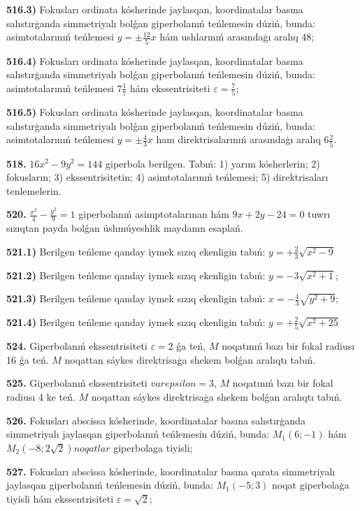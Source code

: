 \textbf{516.3)} Fokusları ordinata kósherinde jaylasqan, koordinatalar basına salıstırģanda simmetriyalı bolǵan giperbolanıń teńlemesin dúziń, bunda: asimtotalarınıń teńlemesi $y= \pm \frac{12}{5} x$ hám ushlarınıń arasındaģı aralıq 48;

\textbf{516.4)} Fokusları ordinata kósherinde jaylasqan, koordinatalar basına salıstırģanda simmetriyalı bolǵan giperbolanıń teńlemesin dúziń, bunda: asimtotalarınıń teńlemesi $7 \frac{1}{7}$ hám ekssentrisiteti $\varepsilon=\frac{7}{5}$;

\textbf{516.5)} Fokusları ordinata kósherinde jaylasqan, koordinatalar basına salıstırģanda simmetriyalı bolǵan giperbolanıń teńlemesin dúziń, bunda: asimtotalarınıń teńlemesi $y= \pm \frac{4}{3} x$ ham direktrisalarınıń arasındaģı aralıq $6 \frac{2}{5}$.

\textbf{518.} $16 x^2-9 y^2=144$ giperbola berilgen. Tabıń: 1) yarım kósherlerin; 2) fokusların; 3) ekssentrisitetin; 4) asimtotalarınıń teńlemesi; 5) direktrisaları tenlemelerin.

\textbf {520.} $\frac{x^2}{4}-\frac{y^2}{9}=1$ giperbolanıń asimptotalarınan hám $9 x+2 y-24=0$ tuwrı sızıqtan payda bolǵan úshmúyeshlik maydanın esaplań.

\textbf{521.1) } Berilgen teńleme qanday iymek sızıq ekenligin tabıń: $y=+\frac{2}{3} \sqrt{x^2-9}$

\textbf{521.2)} Berilgen teńleme qanday iymek sızıq ekenligin tabıń: $y=-3 \sqrt{x^2+1}$;

\textbf{521.3)} Berilgen teńleme qanday iymek sızıq ekenligin tabıń: $x=-\frac{4}{3} \sqrt{y^2+9} ;$

\textbf{521.4)} Berilgen teńleme qanday iymek sızıq ekenligin tabıń: $y=+\frac{2}{5} \sqrt{x^2+25}$

\textbf{524.} Giperbolanıń ekssentrisiteti $\varepsilon=2$ ǵa teń, $M$ noqatınıń bazı bir fokal radiusı 16 ǵa teń. $M$ noqattan sáykes direktrisaģa shekem bolǵan aralıqtı tabıń.

\textbf{525.} Giperbolanıń ekssentrisiteti $varepsilon=3$, $M$ noqatınıń bazı bir fokal radiusı 4 ke teń. $M$ noqattan sáykes direktrisaģa shekem bolǵan aralıqtı tabıń.

\textbf{526.} Fokusları abscissa kósherinde, koordinatalar basına salıstırģanda simmetriyalı jaylasqan giperbolanıń teńlemesin dúziń, bunda: $M_1 (6;-1) $ hám $M_2 (-8; 2 \sqrt{2}) noqatlar $ giperbolaga tiyisli;

\textbf{527.} Fokusları abscissa kósherinde, koordinatalar basına qarata simmetriyalı jaylasqan giperbolanıń teńlemesin dúziń, bunda: $M_1 (-5; 3)$ noqat giperbolaģa tiyisli hám ekssentrisiteti $\varepsilon=\sqrt{2}$;

